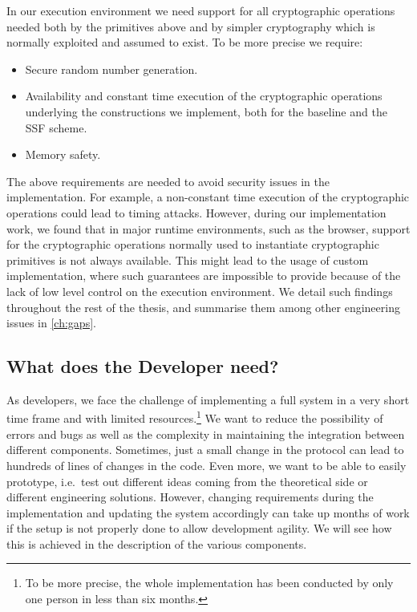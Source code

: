 In our execution environment 
we need support for all cryptographic operations
needed both by the primitives above and by simpler
cryptography which is normally exploited and assumed to exist. 
To be more precise we require:
\begin{itemize}
    \item Secure random number generation.
    \item Availability and constant time execution of the cryptographic operations underlying the constructions we implement, both for the baseline and the SSF scheme.
    \item Memory safety.
\end{itemize}
The above requirements are needed to avoid security
issues in the implementation. For example, a non-constant
time execution of the cryptographic operations could
lead to timing attacks. 
However, during our implementation work, 
we found that in major runtime
environments, such as the browser, 
support for the cryptographic operations normally
used to instantiate cryptographic primitives is not always available.
This might lead to the usage of custom implementation,
where such guarantees are impossible to provide because
of the lack of low level control on the execution environment.
We detail such findings throughout the rest of the thesis,
and summarise them among other engineering issues in \cref{ch:gaps}.

\subsection{What does the Developer need?}\label{sc:developer}

As developers, we face the challenge of implementing a full
system in a very short time frame and with limited resources.\footnote{To be more precise, the whole implementation has been conducted by only one person in less than six months.}
We want to reduce the possibility of errors and bugs
as well as the complexity in maintaining the integration between
different components.
Sometimes, just a small change in the protocol can lead to
hundreds of lines of changes in the code.
Even more, we want to be able to easily prototype, i.e.\ test
out different ideas coming from the theoretical side
or different engineering solutions.
However, changing requirements during the implementation
and updating the system accordingly can take up months of work
if the setup is not properly done to allow development agility.
We will see how this is achieved in the description of the various components.


